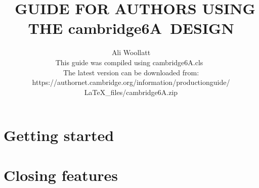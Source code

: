 \documentclass{cambridge6A}
\newcommand\cambridge{cambridge6A}
\theoremstyle{plain}%
\theoremstyle{definition}
\theoremstyle{remark}
\begin{document}
  \title[Subtitle, If You Have One]
    {\LaTeXe\ GUIDE FOR AUTHORS USING THE \cambridge\ DESIGN}

  \author{Ali Woollatt\\[3\baselineskip]
    This guide was compiled using \hbox{\cambridge.cls \version}\\[\baselineskip]
    The latest version can be downloaded from:
    https://authornet.cambridge.org/information/productionguide/
      LaTeX\_files/\cambridge.zip}

  \frontmatter
  \maketitle
  \tableofcontents
  \listoffigures
  \listoftables
  \listofcontributors

  \mainmatter
  \part{Getting started}

  \part{Closing features}

  \backmatter
  \appendix
  
  
  
  \endappendix

  \theendnotes

  \label{refs}
  

  \cleardoublepage




\end{document}
